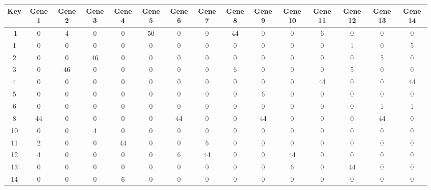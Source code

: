 \begin{tabular}{|c|c|c|c|c|c|c|c|c|c|c|c|c|c|c|}
\hline
Key & Gene 1 & Gene 2 & Gene 3 & Gene 4 & Gene 5 & Gene 6 & Gene 7 & Gene 8 & Gene 9 & Gene 10 & Gene 11 & Gene 12 & Gene 13 & Gene 14 \\
\hline
-1 & 0 & 4 & 0 & 0 & 50 & 0 & 0 & 44 & 0 & 0 & 6 & 0 & 0 & 0 \\
1 & 0 & 0 & 0 & 0 & 0 & 0 & 0 & 0 & 0 & 0 & 0 & 1 & 0 & 5 \\
2 & 0 & 0 & 46 & 0 & 0 & 0 & 0 & 0 & 0 & 0 & 0 & 0 & 5 & 0 \\
3 & 0 & 46 & 0 & 0 & 0 & 0 & 0 & 6 & 0 & 0 & 0 & 5 & 0 & 0 \\
4 & 0 & 0 & 0 & 0 & 0 & 0 & 0 & 0 & 0 & 0 & 44 & 0 & 0 & 44 \\
5 & 0 & 0 & 0 & 0 & 0 & 0 & 0 & 0 & 6 & 0 & 0 & 0 & 0 & 0 \\
6 & 0 & 0 & 0 & 0 & 0 & 0 & 0 & 0 & 0 & 0 & 0 & 0 & 1 & 1 \\
8 & 44 & 0 & 0 & 0 & 0 & 44 & 0 & 0 & 44 & 0 & 0 & 0 & 44 & 0 \\
10 & 0 & 0 & 4 & 0 & 0 & 0 & 0 & 0 & 0 & 0 & 0 & 0 & 0 & 0 \\
11 & 2 & 0 & 0 & 44 & 0 & 0 & 6 & 0 & 0 & 0 & 0 & 0 & 0 & 0 \\
12 & 4 & 0 & 0 & 0 & 0 & 6 & 44 & 0 & 0 & 44 & 0 & 0 & 0 & 0 \\
13 & 0 & 0 & 0 & 0 & 0 & 0 & 0 & 0 & 0 & 6 & 0 & 44 & 0 & 0 \\
14 & 0 & 0 & 0 & 6 & 0 & 0 & 0 & 0 & 0 & 0 & 0 & 0 & 0 & 0 \\
\hline
\end{tabular}